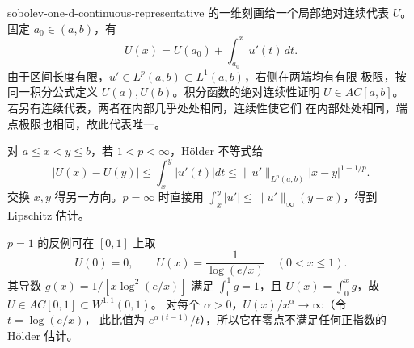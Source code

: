 \begin{solution}{sobolev-one-d-continuous-representative}
的一维刻画给一个局部绝对连续代表 \(U\)。固定 \(a_0\in(a,b)\)，有
\[
 U(x)=U(a_0)+\int_{a_0}^{x}u'(t)\,dt.
\]
由于区间长度有限，\(u'\in L^p(a,b)\subset L^1(a,b)\)，右侧在两端均有有限
极限，按同一积分公式定义 \(U(a),U(b)\)。积分函数的绝对连续性证明
\(U\in AC[a,b]\)。若另有连续代表，两者在内部几乎处处相同，连续性使它们
在内部处处相同，端点极限也相同，故此代表唯一。

对 \(a\le x<y\le b\)，若 \(1<p<\infty\)，Hölder 不等式给
\[
 |U(x)-U(y)|
 \le\int_x^y|u'(t)|dt
 \le\|u'\|_{L^p(a,b)}|x-y|^{1-1/p}.
\]
交换 \(x,y\) 得另一方向。\(p=\infty\) 时直接用
\(\int_x^y|u'|\le\|u'\|_\infty(y-x)\)，得到 Lipschitz 估计。

\(p=1\) 的反例可在 \([0,1]\) 上取
\[
 U(0)=0,\qquad U(x)=\frac1{\log(e/x)}\quad(0<x\le1).
\]
其导数 \(g(x)=1/[x\log^2(e/x)]\) 满足 \(\int_0^1g=1\)，且
\(U(x)=\int_0^xg\)，故 \(U\in AC[0,1]\subset W^{1,1}(0,1)\)。
对每个 \(\alpha>0\)，\(U(x)/x^\alpha\to\infty\)（令 \(t=\log(e/x)\)，
此比值为 \(e^{\alpha(t-1)}/t\)），所以它在零点不满足任何正指数的 Hölder 估计。
\end{solution}
